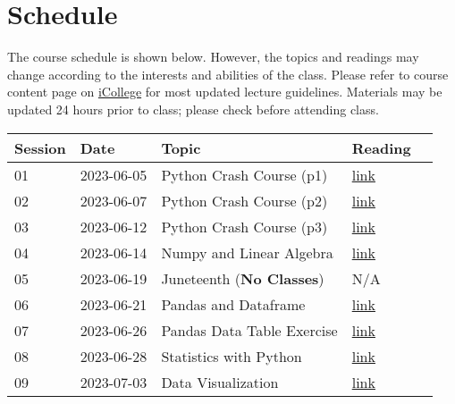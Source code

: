 \documentclass{article}
\begin{document}
\section{Schedule}
The course schedule is shown below. However, the topics and readings may change according to the interests and abilities of the class. Please refer to course content page on \href{https://gastate.view.usg.edu/d2l/home/2822689}{iCollege} for most updated lecture guidelines.  Materials may be updated 24 hours prior to class; please check before attending class.

\begin{center}
\begin{tabular}{lllll}
\hline
Session & Date  & Topic                                 & Reading \\
\hline
01       & 2023-06-05 & Python Crash Course (p1)              & \href{https://github.com/xiangshiyin/data-programming-with-python/tree/main/2023-summer/2023-06-05}{link}\\
02       & 2023-06-07 & Python Crash Course (p2)              & \href{https://github.com/xiangshiyin/data-programming-with-python/tree/main/2023-summer/2023-06-07}{link}\\
03       & 2023-06-12 & Python Crash Course (p3)              & \href{https://github.com/xiangshiyin/data-programming-with-python/tree/main/2023-summer/2023-06-12}{link}\\
04       & 2023-06-14 & Numpy and Linear Algebra          & \href{https://github.com/xiangshiyin/data-programming-with-python/tree/main/2023-summer/2023-06-14}{link}\\
05       & 2023-06-19 & Juneteenth (\textbf{No Classes})                & N/A\\
06       & 2023-06-21 & Pandas and Dataframe                & \href{https://github.com/xiangshiyin/data-programming-with-python/tree/main/2023-summer/2023-06-21}{link}\\
07       & 2023-06-26 & Pandas Data Table Exercise                & \href{https://github.com/xiangshiyin/data-programming-with-python/tree/main/2023-summer/2023-06-26}{link}\\
08       & 2023-06-28 & Statistics with Python                & \href{https://github.com/xiangshiyin/data-programming-with-python/tree/main/2023-summer/2023-06-28}{link}\\
09       & 2023-07-03 & Data Visualization               & \href{https://github.com/xiangshiyin/data-programming-with-python/tree/main/2023-summer/2023-07-03}{link}\\

\end{tabular}
\end{center}
\end{document}
